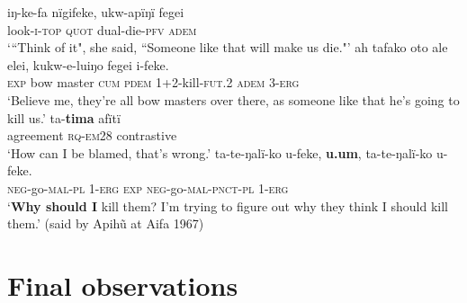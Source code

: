 \documentclass[output=paper]{langsci/langscibook}
\begin{document}
\begin{exe}
\ex \label{ex:eb71}
	\begin{xlist}
	\ex 
	\gll iŋ-ke-fa nïgifeke, ukw-apïŋï fegei\\
	look-\textsc{i-top} \textsc{quot} dual-die-\textsc{pfv} \textsc{adem}\\
	\trans ‘“Think of it", she said, “Someone like that will make us die."’
	\ex 
	\gll ah tafako oto ale elei, kukw-e-luiŋo fegei i-feke.\\
	\textsc{exp} bow master \textsc{cum} \textsc{pdem} 1+2-kill-\textsc{fut.2} \textsc{adem} 3-\textsc{erg}\\
	\trans ‘Believe me, they’re all bow masters over there, as someone like that he’s going to kill us.’
	\ex
	 ta-\textbf{tima} afïtï\\
	agreement \textsc{rq-em28} contrastive\\
	\trans ‘How can I be blamed, that’s wrong.’
	\ex
	\gll ta-te-ŋalï-ko u-feke, \textbf{u.um}, ta-te-ŋalï-ko u-feke.\\
	\textsc{neg}-go-\textsc{mal-pl} 1-\textsc{erg} \textsc{exp} \textsc{neg}-go-\textsc{mal-pnct-pl} 1-\textsc{erg}\\
 	\trans ‘\textbf{Why should I} kill them?  I’m trying to figure out why they think I should kill them.’ (said by Apihũ at Aifa 1967)
\end{xlist}
\end{exe}



\section{Final observations}\label{s:eb5}
\end{document}
